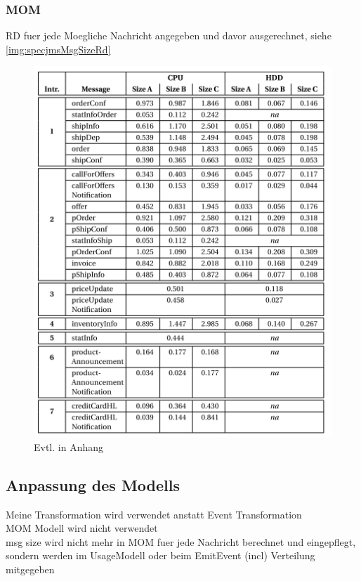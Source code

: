 \subsubsection{MOM}
RD fuer jede Moegliche Nachricht angegeben und davor ausgerechnet, siehe \autoref{img:specjmsMsgSizeRd} \\
\begin{figure}
\center
  \includegraphics[width=1\textwidth]{images/specjmsmsgsizerd.png}
  \caption{Evtl. in Anhang}
  \label{img:specjmsMsgSizeRd}
\end{figure}


\subsection{Anpassung des Modells}
Meine Transformation wird verwendet anstatt Event Transformation \\
MOM Modell wird nicht verwendet\\
msg size wird nicht mehr in MOM fuer jede Nachricht berechnet und eingepflegt, sondern werden im UsageModell oder beim EmitEvent (incl) Verteilung mitgegeben \\


